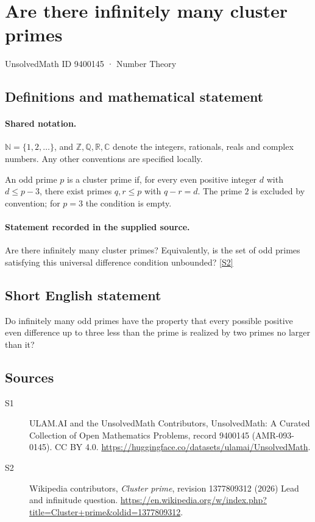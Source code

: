\documentclass[11pt]{article}
\newcommand{\sref}[2]{\hyperlink{source:#1:#2}{[S#2]}}
\begin{document}
\setcounter{section}{9400144}
\section{Are there infinitely many cluster primes}\label{9400145}
{\small\sffamily UnsolvedMath ID 9400145 · Number Theory}
\subsection{Definitions and mathematical statement}

\paragraph{Shared notation.}$\mathbb N=\{1,2,\ldots\}$, and $\mathbb Z,\mathbb Q,\mathbb R,\mathbb C$ denote the integers, rationals, reals and complex numbers. Any other conventions are specified locally.


An odd prime $p$ is a cluster prime if, for every even positive integer $d$ with $d\le p-3$, there exist primes $q,r\le p$ with $q-r=d$. The prime $2$ is excluded by convention; for $p=3$ the condition is empty.
\paragraph{Statement recorded in the supplied source.}
Are there infinitely many cluster primes? Equivalently, is the set of odd primes satisfying this universal difference condition unbounded? \sref{9400145}{2}
\subsection{Short English statement}
Do infinitely many odd primes have the property that every possible positive even difference up to three less than the prime is realized by two primes no larger than it?
\subsection{Sources}
\begin{description}
\item[\hypertarget{source:9400145:1}{S1}] ULAM.AI and the UnsolvedMath Contributors, UnsolvedMath: A Curated Collection of Open Mathematics Problems, record 9400145 (AMR-093-0145). CC BY 4.0. \url{https://huggingface.co/datasets/ulamai/UnsolvedMath}.
\item[\hypertarget{source:9400145:2}{S2}] Wikipedia contributors, \emph{Cluster prime}, revision 1377809312 (2026) Lead and infinitude question. \url{https://en.wikipedia.org/w/index.php?title=Cluster+prime&oldid=1377809312}.
\end{description}
\label{end:9400145}
\end{document}
